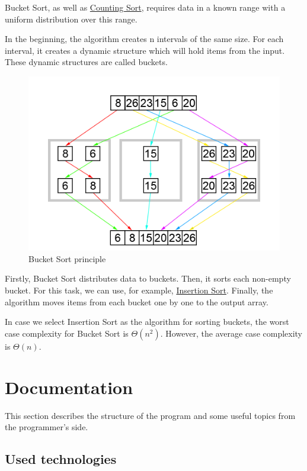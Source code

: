 \documentclass[
  field=inf,
  biblatex,
  language=english,
  glossaries,
  theorems=false,
  sourcecodes=false,
  index
]{kidiplom}
\begin{document}
Bucket Sort, as well as \hyperref[sec:counting]{Counting Sort}, requires data in a known range with a uniform distribution over this range.

In the beginning, the algorithm creates n intervals of the same size. For each interval, it creates a dynamic structure which will hold items from the input. These dynamic structures are called buckets.

\begin{figure}[H]
\begin{center}
	
	\includegraphics[scale=0.3]{img/Bucketsort.png}
	\caption{Bucket Sort principle}\label{fig:bucketsort}
\end{center}
\end{figure}

Firstly, Bucket Sort distributes data to buckets. Then, it sorts each non-empty bucket. For this task, we can use, for example, \hyperref[sec:insertion]{Insertion Sort}. Finally, the algorithm moves items from each bucket one by one to the output array. 

In case we select Insertion Sort as the algorithm for sorting buckets, the worst case complexity for Bucket Sort is $\Theta(n^2)$. However, the average case complexity is $\Theta(n)$.


\newpage
\section{Documentation}

This section describes the structure of the program and some useful topics from the programmer's side. 

\subsection{Used technologies}
\end{document}
